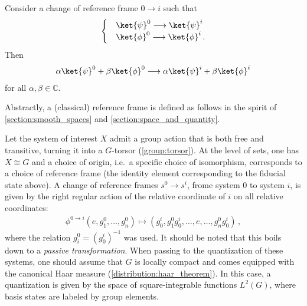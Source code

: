     \begin{axiom}
        Consider a change of reference frame $0\longrightarrow i$ such that
        \begin{gather}
            \begin{cases}
                &\ket{\psi}^0\longrightarrow\ket{\psi}^i\\
                &\ket{\phi}^0\longrightarrow\ket{\phi}^i\,.
            \end{cases}
        \end{gather}
        Then
        \begin{gather}
            \alpha\ket{\psi}^0+\beta\ket{\phi}^0\longrightarrow\alpha\ket{\psi}^i+\beta\ket{\phi}^i
        \end{gather}
        for all $\alpha,\beta\in\mathbb{C}$.
    \end{axiom}

    Abstractly, a (classical) reference frame is defined as follows in the spirit of \cref{section:smooth_spaces} and \cref{section:space_and_quantity}.

    Let the system of interest $X$ admit a group action that is both free and transitive, turning it into a $G$-torsor (\cref{group:torsor}). At the level of sets, one has $X\cong G$ and a choice of origin, i.e.~a specific choice of isomorphism, corresponds to a choice of reference frame (the identity element corresponding to the fiducial state above). A change of reference frames $s^0\longrightarrow s^i$, frome system $0$ to system $i$, is given by the right regular action of the relative coordinate of $i$ on all relative coordinates:
    \begin{gather}
        \phi^{0\longrightarrow i}(e,g^0_1,\ldots,g^0_n)\mapsto(g^i_0,g^0_1g^i_0,\ldots,e,\ldots,g^0_ng^i_0)\,,
    \end{gather}
    where the relation $g^0_i=(g^i_0)^{-1}$ was used. It should be noted that this boils down to a \textit{passive transformation}. When passing to the quantization of these systems, one should assume that $G$ is locally compact and comes equipped with the canonical Haar measure (\cref{distribution:haar_theorem}). In this case, a quantization is given by the space of square-integrable functions $L^2(G)$, where basis states are labeled by group elements.

